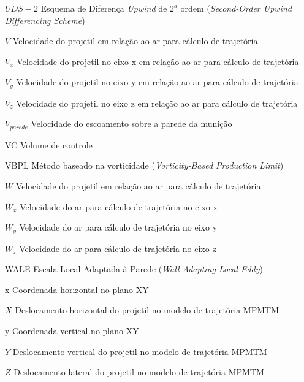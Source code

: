 \begin{siglas}
    \item[$UDS-2$] Esquema de Diferença \textit{Upwind} de $2^a$ ordem (\textit{Second-Order Upwind Differencing Scheme})
    \item[$V$] Velocidade do projetil em relação ao ar para cálculo de trajetória
    \item[$V_x$] Velocidade do projetil no eixo x em relação ao ar para cálculo de trajetória
    \item[$V_y$] Velocidade do projetil no eixo y em relação ao ar para cálculo de trajetória
    \item[$V_z$] Velocidade do projetil no eixo z em relação ao ar para cálculo de trajetória
    \item[$V_{parede}$] Velocidade do escoamento sobre a parede da munição
    \item[VC] Volume de controle
    \item[VBPL] Método baseado na vorticidade (\textit{Vorticity-Based Production Limit})
    \item[$W$] Velocidade do projetil em relação ao ar para cálculo de trajetória
    \item[$W_x$] Velocidade do ar para cálculo de trajetória no eixo x
    \item[$W_y$] Velocidade do ar para cálculo de trajetória no eixo y
    \item[$W_z$] Velocidade do ar para cálculo de trajetória no eixo z
    \item[WALE] Escala Local Adaptada à Parede (\textit{Wall Adapting Local Eddy})
    \item[x] Coordenada horizontal no plano XY
    \item[$X$] Deslocamento horizontal do projetil no modelo de trajetória MPMTM
    \item[y] Coordenada vertical no plano XY
    \item[$Y$] Deslocamento vertical do projetil no modelo de trajetória MPMTM
    \item[$Z$] Deslocamento lateral do projetil no modelo de trajetória MPMTM
\end{siglas}


